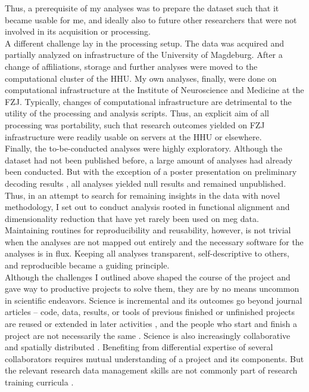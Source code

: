 Thus, a prerequisite of my analyses was to prepare the dataset such that it became usable for me, and ideally also to future other researchers that were not involved in its acquisition or processing.\\
A different challenge lay in the processing setup.
The data was acquired and partially analyzed on infrastructure of the University of Magdeburg.
After a change of affiliations, storage and further analyses were moved to the computational cluster of the \gls{HHU}.
My own analyses, finally, were done on computational infrastructure at the Institute of Neuroscience and Medicine at the \gls{FZJ}.
Typically, changes of computational infrastructure are detrimental to the utility of the processing and analysis scripts.
Thus, an explicit aim of all processing was portability, such that research outcomes yielded on \gls{FZJ} infrastructure were readily usable on servers at the \gls{HHU} or elsewhere.\\
Finally, the to-be-conducted analyses were highly exploratory.
Although the dataset had not been published before, a large amount of analyses had already been conducted.
But with the exception of a poster presentation on preliminary decoding results \citep{kaiserposter}, all analyses yielded null results and remained unpublished.
Thus, in an attempt to search for remaining insights in the data with novel methodology, I set out to conduct analysis rooted in functional alignment and dimensionality reduction that have yet rarely been used on \gls{meg} data.
Maintaining routines for reproducibility and reusability, however, is not trivial when the analyses are not mapped out entirely and the necessary software for the analyses is in flux.
Keeping all analyses transparent, self-descriptive to others, and reproducible became a guiding principle.\\
Although the challenges I outlined above shaped the course of the project and gave way to productive projects to solve them, they are by no means uncommon in scientific endeavors.
Science is incremental and its outcomes go beyond journal articles -- code, data, results, or tools of previous finished or unfinished projects are reused or extended in later activities \citep{mons2018data}, and the people who start and finish a project are not necessarily the same \citep{puce2017review}.
Science is also increasingly collaborative and spatially distributed \citep{csomos2020exploring}.
Benefiting from differential expertise of several collaborators requires mutual understanding of a project and its components.
But the relevant research data management skills are not commonly part of research training curricula \citep{grisham2016proposed}. %
